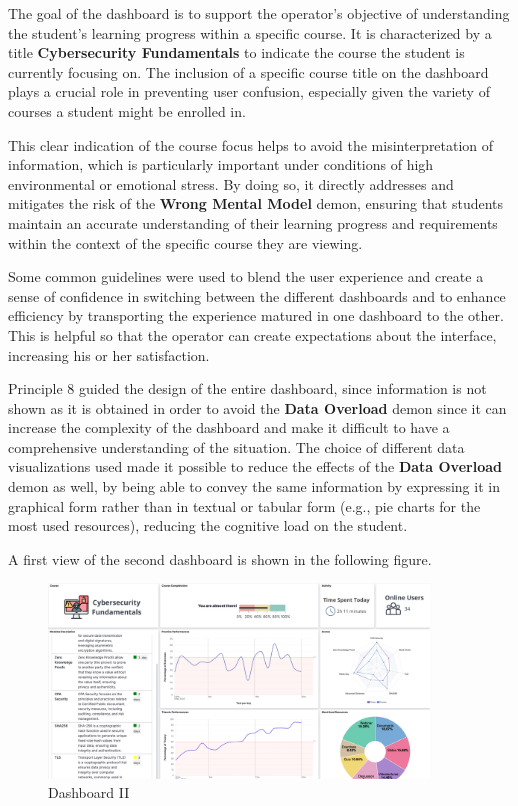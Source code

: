The goal of the dashboard is to support the operator's objective of understanding the student's learning progress within a specific course. It is characterized by a title \textbf{Cybersecurity Fundamentals} to indicate the course the student is currently focusing on. The inclusion of a specific course title on the dashboard plays a crucial role in preventing user confusion, especially given the variety of courses a student might be enrolled in. 

This clear indication of the course focus helps to avoid the misinterpretation of information, which is particularly important under conditions of high environmental or emotional stress. By doing so, it directly addresses and mitigates the risk of the \textbf{Wrong Mental Model} demon, ensuring that students maintain an accurate understanding of their learning progress and requirements within the context of the specific course they are viewing. 

Some common guidelines were used to blend the user experience and create a sense of confidence in switching between the different dashboards and to enhance efficiency by transporting the experience matured in one dashboard to the other. This is helpful so that the operator can create expectations about the interface, increasing his or her satisfaction.


Principle 8 guided the design of the entire dashboard, since information is not shown as it is obtained in order to avoid the \textbf{Data Overload} demon since it can increase the complexity of the dashboard and make it difficult to have a comprehensive understanding of the situation.
The choice of different data visualizations used made it possible to reduce the effects of the \textbf{Data Overload} demon as well, by being able to convey the same information by expressing it in graphical form rather than in textual or tabular form (e.g., pie charts for the most used resources), reducing the cognitive load on the student. 

A first view of the second dashboard is shown in the following figure.

\begin{figure}[H]
    \centering
    \includegraphics[width=0.9\textwidth]{assets/dashboard_2.png}
    \caption{Dashboard II}
    \label{fig:dashboard_2}
\end{figure}

